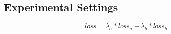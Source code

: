 
\subsection{Experimental Settings}

\begin{equation}
loss = \lambda_a * loss_{a} + \lambda_b * loss_{b}
\end{equation}
